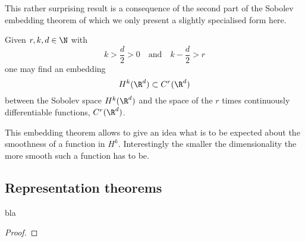 This rather surprising result is a consequence of the second part of
the Sobolev embedding theorem
of which we only present a slightly specialised form  here.
\begin{thm}
	Given $r, k, d \in \N$ with
	\[ k > \frac{d}{2} > 0 \quad \text{and} \quad k -\frac{d}{2} > r \]
	one may find an embedding
	\[ H^k(\R^d) \subset C^r(\R^d) \]
	between the Sobolev space $H^k(\R^d)$ and the space of the $r$ times
	continuously differentiable functions, $C^r(\R^d)$.
\end{thm}
This embedding theorem allows to give an idea what is to be expected about
the smoothness of a function in $H^k$.
Interestingly the smaller the dimensionality the more smooth such a function
has to be.

\subsection{Representation theorems}

\begin{thm}
	\label{thm:Riesz}
	

	bla
	\begin{proof}
	\end{proof}
\end{thm}
